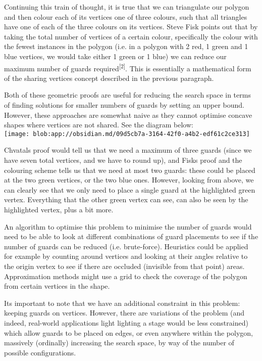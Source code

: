 \documentclass[
]{article}
\begin{document}
Continuing this train of thought, it is true that we can triangulate our
polygon and then colour each of its vertices one of three colours, such
that all triangles have one of each of the three colours on
it\textquotesingle s vertices. Steve Fisk points out that by taking the
total number of vertices of a certain colour, specifically the colour
with the fewest instances in the polygon (i.e. in a polygon with 2 red,
1 green and 1 blue vertices, we would take either 1 green or 1 blue) we
can reduce our maximum number of guards
required\textsuperscript{{[}2{]}}. This is essentially a mathematical
form of the \textquotesingle sharing vertices\textquotesingle{} concept
described in the previous paragraph.

Both of these geometric proofs are useful for reducing the search space
in terms of finding solutions for smaller numbers of guards by setting
an upper bound. However, these approaches are somewhat naive as they
cannot optimise concave shapes where vertices are not shared. See the
diagram below:\\

\texttt{[image: blob:app://obsidian.md/09d5cb7a-3164-42f0-a4b2-edf61c2ce313]}

\hfill\break
Chvatal\textquotesingle s proof would tell us that we need a maximum of
three guards (since we have seven total vertices, and we have to round
up), and Fisk\textquotesingle s proof and the colouring scheme tells us
that we need at most two guards: these could be placed at the two green
vertices, or the two blue ones. However, looking from above, we can
clearly see that we only need to place a single guard at the highlighted
green vertex. Everything that the other green vertex can see, can also
be seen by the highlighted vertex, plus a bit more.

An algorithm to optimise this problem to minimise the number of guards
would need to be able to look at different combinations of guard
placements to see if the number of guards can be reduced (i.e.
brute-force). Heuristics could be applied for example by counting around
vertices and looking at their angles relative to the origin vertex to
see if there are occluded (invisible from that point) areas.
Approximation methods might use a grid to check the coverage of the
polygon from certain vertices in the shape.

It\textquotesingle s important to note that we have an additional
constraint in this problem: keeping guards on vertices. However, there
are variations of the problem (and indeed, real-world applications light
lighting a stage would be less constrained) which allow guards to be
placed on edges, or even anywhere within the polygon, massively
(ordinally) increasing the search space, by way of the number of
possible configurations.
\end{document}
